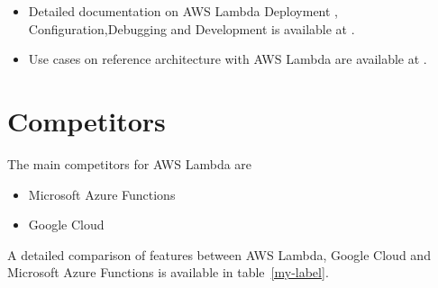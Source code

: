 \documentclass[9pt,twocolumn,twoside]{../../styles/osajnl}
\begin{document}
\begin{itemize}
\renewcommand{\labelitemi}{\scriptsize$\bullet$} 
\item Detailed documentation on AWS Lambda  Deployment , 
Configuration,Debugging and Development is available at \cite{www-AWSLambdaDoc}.
\item Use cases on reference architecture with  AWS Lambda are available at 
\cite{www-AWSLambdaUseCase}. 
\end{itemize}

\section{Competitors}

The main competitors for AWS Lambda are
\begin{itemize}
\renewcommand{\labelitemi}{\scriptsize$\bullet$} 
\item Microsoft Azure Functions
\item Google Cloud
\end{itemize}

A detailed comparison of features between AWS Lambda, Google Cloud and 
Microsoft Azure Functions is available in table~\ref{my-label}.
\end{document}
